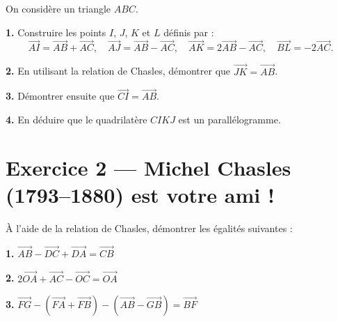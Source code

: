 \documentclass[12pt]{article}
\begin{document}
\vspace{0.3cm}

On considère un triangle $ABC$.

\textbf{1.} Construire les points $I$, $J$, $K$ et $L$ définis par :
\[
\overrightarrow{AI} = \overrightarrow{AB} + \overrightarrow{AC},\quad
\overrightarrow{AJ} = \overrightarrow{AB} - \overrightarrow{AC},\quad
\overrightarrow{AK} = 2\overrightarrow{AB} - \overrightarrow{AC},\quad
\overrightarrow{BL} = -2\overrightarrow{AC}.
\]

\textbf{2.} En utilisant la relation de Chasles, démontrer que $\overrightarrow{JK} = \overrightarrow{AB}$.
\begin{tcolorbox}[case,height=3.5cm]\end{tcolorbox}

\textbf{3.} Démontrer ensuite que $\overrightarrow{CI} = \overrightarrow{AB}$.
\begin{tcolorbox}[case,height=3.5cm]\end{tcolorbox}


\textbf{4.} En déduire que le quadrilatère $CIKJ$ est un parallélogramme.
\begin{tcolorbox}[case,height=3cm]\end{tcolorbox}




\newpage
\section*{Exercice 2 — Michel Chasles (1793–1880) est votre ami !}

À l’aide de la relation de Chasles, démontrer les égalités suivantes :

\textbf{1.} $\overrightarrow{AB} - \overrightarrow{DC} + \overrightarrow{DA} = \overrightarrow{CB}$
\begin{tcolorbox}[case]\end{tcolorbox}

\textbf{2.} $2\overrightarrow{OA} + \overrightarrow{AC} - \overrightarrow{OC} = \overrightarrow{OA}$
\begin{tcolorbox}[case]\end{tcolorbox}

\textbf{3.} $\overrightarrow{FG} - (\overrightarrow{FA} + \overrightarrow{FB}) - (\overrightarrow{AB} - \overrightarrow{GB}) = \overrightarrow{BF}$
\begin{tcolorbox}[case]\end{tcolorbox}
\end{document}
